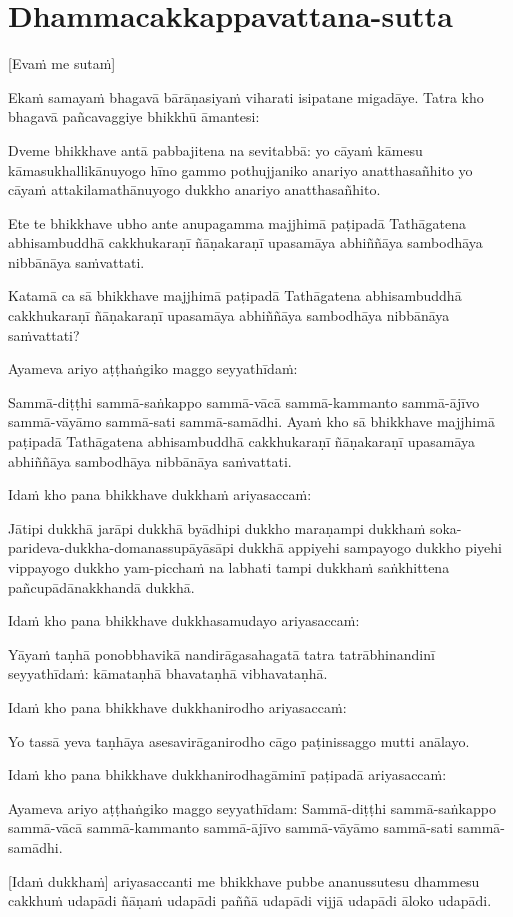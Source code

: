 \section{Dhammacakkappavattana-sutta}

[Evaṁ me sutaṁ]

Ekaṁ samayaṁ bhagavā bārāṇasiyaṁ viharati isipatane migadāye. Tatra kho bhagavā pañcavaggiye bhikkhū āmantesi:

Dveme bhikkhave antā pabbajitena na sevitabbā: yo cāyaṁ kāmesu kāmasukhallikānuyogo hīno gammo pothujjaniko anariyo anatthasañhito yo cāyaṁ attakilamathānuyogo dukkho anariyo anatthasañhito.

Ete te bhikkhave ubho ante anupagamma majjhimā paṭipadā Tathāgatena abhisambuddhā cakkhukaraṇī ñāṇakaraṇī upasamāya abhiññāya sambodhāya nibbānāya saṁvattati.

Katamā ca sā bhikkhave majjhimā paṭipadā Tathāgatena abhisambuddhā cakkhukaraṇī ñāṇakaraṇī upasamāya abhiññāya sambodhāya nibbānāya saṁvattati?

Ayameva ariyo aṭṭhaṅgiko maggo seyyathīdaṁ:

Sammā-diṭṭhi sammā-saṅkappo sammā-vācā sammā-kammanto sammā-ājīvo sammā-vāyāmo sammā-sati sammā-samādhi.
Ayaṁ kho sā bhikkhave majjhimā paṭipadā Tathāgatena abhisambuddhā cakkhukaraṇī ñāṇakaraṇī upasamāya abhiññāya sambodhāya nibbānāya saṁvattati.

Idaṁ kho pana bhikkhave dukkhaṁ ariyasaccaṁ:

Jātipi dukkhā jarāpi dukkhā byādhipi dukkho maraṇampi dukkhaṁ soka-parideva-dukkha-domanassupāyāsāpi dukkhā appiyehi sampayogo dukkho piyehi vippayogo dukkho yam-picchaṁ na labhati tampi dukkhaṁ saṅkhittena pañcupādānakkhandā dukkhā.

Idaṁ kho pana bhikkhave dukkhasamudayo ariyasaccaṁ:

Yāyaṁ taṇhā ponobbhavikā nandirāgasahagatā tatra tatrābhinandinī seyyathīdaṁ: kāmataṇhā bhavataṇhā vibhavataṇhā.

Idaṁ kho pana bhikkhave dukkhanirodho ariyasaccaṁ:

Yo tassā yeva taṇhāya asesavirāganirodho cāgo paṭinissaggo mutti anālayo.

Idaṁ kho pana bhikkhave dukkhanirodhagāminī paṭipadā ariyasaccaṁ:

Ayameva ariyo aṭṭhaṅgiko maggo seyyathīdam: Sammā-diṭṭhi sammā-saṅkappo sammā-vācā sammā-kammanto sammā-ājīvo sammā-vāyāmo sammā-sati sammā-samādhi.

[Idaṁ dukkhaṁ] ariyasaccanti me bhikkhave pubbe ananussutesu dhammesu cakkhuṁ udapādi ñāṇaṁ udapādi paññā udapādi vijjā udapādi āloko udapādi.


